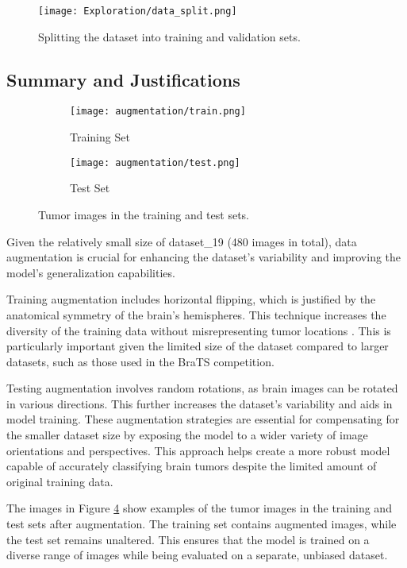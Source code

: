 \begin{figure}[H]
  \begin{center}
    \texttt{[image: Exploration/data\_split.png]}
  \end{center}
  \caption{Splitting the dataset into training and validation sets.}\label{fig:data_split}
\end{figure}


\subsection{Summary and Justifications}

\begin{figure}[H]
  \centering
  \begin{subfigure}[b]{0.4\textwidth}
    \centering
    \texttt{[image: augmentation/train.png]}
    \caption{Training Set}
    \label{fig:train_set}
  \end{subfigure}
  \hfill
  \begin{subfigure}[b]{0.4\textwidth}
    \centering
    \texttt{[image: augmentation/test.png]}
    \caption{Test Set}
    \label{fig:test_set}
  \end{subfigure}
  \caption{Tumor images in the training and test sets.}
  \label{fig:train_test_sets}
  
\end{figure}

Given the relatively small size of dataset\_19 (480 images in total), data augmentation is crucial for enhancing the dataset's variability and improving the model's generalization capabilities.

Training augmentation includes horizontal flipping, which is justified by the anatomical symmetry of the brain's hemispheres. This technique increases the diversity of the training data without misrepresenting tumor locations \cite{nalepa_data_2019}. This is particularly important given the limited size of the dataset compared to larger datasets, such as those used in the BraTS competition.

Testing augmentation involves random rotations, as brain images can be rotated in various directions. This further increases the dataset's variability and aids in model training. These augmentation strategies are essential for compensating for the smaller dataset size by exposing the model to a wider variety of image orientations and perspectives. This approach helps create a more robust model capable of accurately classifying brain tumors despite the limited amount of original training data.

The images in Figure \ref{fig:train_test_sets} show examples of the tumor images in the training and test sets after augmentation. The training set contains augmented images, while the test set remains unaltered. This ensures that the model is trained on a diverse range of images while being evaluated on a separate, unbiased dataset.
